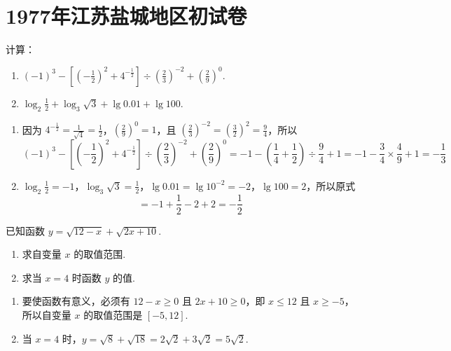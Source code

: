\chapter{1977年江苏盐城地区初试卷}

\begin{problem}
计算：

\begin{enumerate}
\item \( (-1)^3-\left[\left(-\frac{1}{2}\right)^2+4^{-\frac{1}{2}}\right]\div\left(\frac{2}{3}\right)^{-2}+\left(\frac{2}{9}\right)^0 \).

\item \( \log_2\frac{1}{2}+\log_3\sqrt{3}+\lg 0.01+\lg 100 \).
\end{enumerate}
\end{problem}

\begin{solution}
\begin{enumerate}
\item 因为 \(4^{-\frac{1}{2}}=\frac{1}{\sqrt{4}}=\frac{1}{2}\)，\(\left(\frac{2}{9}\right)^0=1\)，且 \(\left(\frac{2}{3}\right)^{-2}=\left(\frac{3}{2}\right)^2=\frac{9}{4}\)，所以
\[
(-1)^3-\left[\left(-\frac{1}{2}\right)^2+4^{-\frac{1}{2}}\right]\div\left(\frac{2}{3}\right)^{-2}+\left(\frac{2}{9}\right)^0
=-1-\left(\frac{1}{4}+\frac{1}{2}\right)\div\frac{9}{4}+1
=-1-\frac{3}{4}\times\frac{4}{9}+1=-\frac{1}{3}
\]

\item \(\log_2\frac{1}{2}=-1\)，\(\log_3\sqrt{3}=\frac{1}{2}\)，\(\lg0.01=\lg10^{-2}=-2\)，\(\lg100=2\)，所以原式
\[
=-1+\frac{1}{2}-2+2=-\frac{1}{2}
\]
\end{enumerate}
\end{solution}

\begin{problem}
已知函数 \( y=\sqrt{12-x}+\sqrt{2x+10} \).

\begin{enumerate}
\item 求自变量 \(x\) 的取值范围.

\item 求当 \(x=4\) 时函数 \(y\) 的值.
\end{enumerate}
\end{problem}

\begin{solution}
\begin{enumerate}
\item 要使函数有意义，必须有 \(12-x\geqslant0\) 且 \(2x+10\geqslant0\)，即 \(x\leqslant12\) 且 \(x\geqslant-5\)，所以自变量 \(x\) 的取值范围是 \([-5,12]\).

\item 当 \(x=4\) 时，\(y=\sqrt{8}+\sqrt{18}=2\sqrt{2}+3\sqrt{2}=5\sqrt{2}\).
\end{enumerate}
\end{solution}

